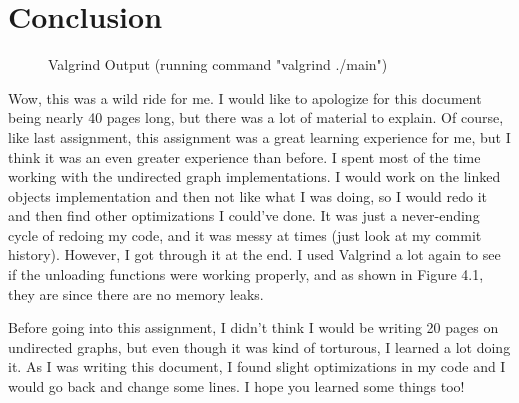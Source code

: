\documentclass[letterpaper, 10pt]{article}
\begin{document}
\section{Conclusion}
\setcounter{figure}{0}

\begin{figure}[H] 
    \centering 
    \caption{Valgrind Output (running command "valgrind ./main")}
    \label{fig:figure4.1}
\end{figure}

\noindent
Wow, this was a wild ride for me. I would like to apologize for this document being nearly 40 pages long, but there was a lot of material to explain. Of course, like last assignment, this assignment was a great learning experience for me, but I think it was an even greater experience than before. I spent most of the time working with the undirected graph implementations. I would work on the linked objects implementation and then not like what I was doing, so I would redo it and then find other optimizations I could've done. It was just a never-ending cycle of redoing my code, and it was messy at times (just look at my commit history). However, I got through it at the end. I used Valgrind a lot again to see if the unloading functions were working properly, and as shown in Figure 4.1, they are since there are no memory leaks.

\vspace{1em}
\noindent
Before going into this assignment, I didn't think I would be writing 20 pages on undirected graphs, but even though it was kind of torturous, I learned a lot doing it. As I was writing this document, I found slight optimizations in my code and I would go back and change some lines. I hope you learned some things too! 
\end{document}
